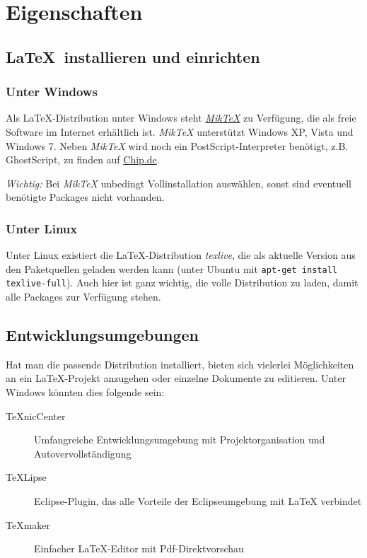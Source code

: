 \chapter{Eigenschaften}

\section{\LaTeX\ installieren und einrichten}
\subsection{Unter Windows}

Als LaTeX-Distribution unter Windows steht \href{http://www.miktex.org/}{\textit{MikTeX}} zu Verfügung, die als freie Software im Internet erhältlich ist. 
\textit{MikTeX} unterstützt Windows XP, Vista und Windows 7. Neben \textit{MikTeX} wird noch ein PostScript-Interpreter benötigt, 
z.B. GhostScript, zu finden auf \href{http://www.chip.de}{Chip.de}.

\textit{Wichtig:} Bei \textit{MikTeX} unbedingt Vollinstallation auswählen, sonst sind eventuell benötigte Packages nicht vorhanden.

\subsection{Unter Linux}

Unter Linux existiert die LaTeX-Distribution \textit{texlive}, die als aktuelle Version aus den Paketquellen geladen werden kann (unter Ubuntu mit 
\lstinline{apt-get install texlive-full}). Auch hier ist ganz wichtig, die volle Distribution zu laden, damit alle Packages zur Verfügung stehen.

\section{Entwicklungsumgebungen}

Hat man die passende Distribution installiert, bieten sich vielerlei Möglichkeiten an ein LaTeX-Projekt anzugehen oder einzelne Dokumente zu editieren. Unter
Windows könnten dies folgende sein:

\begin{description}
	\item [TeXnicCenter] Umfangreiche Entwicklungsumgebung mit Projektorganisation und Autovervollständigung
	\item [TeXLipse] Eclipse-Plugin, das alle Vorteile der Eclipseumgebung mit LaTeX verbindet
	\item [TeXmaker] Einfacher LaTeX-Editor mit Pdf-Direktvorschau
\end{description}


